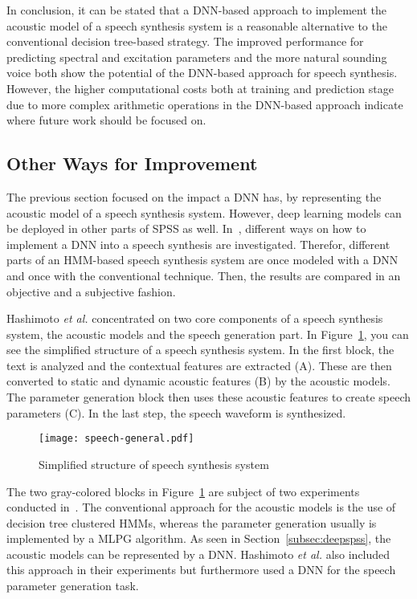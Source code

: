 In conclusion, it can be stated that a \ac{DNN}-based approach to implement the acoustic model
of a speech synthesis system is a reasonable alternative to the conventional decision tree-based strategy. The improved performance for predicting spectral and excitation parameters and the more natural sounding voice both show the potential of the \ac{DNN}-based approach for speech synthesis. However, the higher computational costs both at training and prediction stage due to more complex arithmetic operations in the \ac{DNN}-based approach indicate where future work should be focused on.

\subsection{Other Ways for Improvement}
\label{subsec:deepeffect}

The previous section focused on the impact a \ac{DNN} has, by representing the acoustic model of a speech synthesis system. However, deep learning models can be deployed in other parts of \ac{SPSS} as well. In~\cite{hashimoto:effect}, different ways on how to implement a \ac{DNN} into a speech synthesis are investigated. Therefor, different parts of an \ac{HMM}-based speech synthesis system are once modeled with a \ac{DNN} and once with the conventional technique. Then, the results are compared in an objective and a subjective fashion.

Hashimoto \textit{et al.} concentrated on two core components of a speech synthesis system, the acoustic models and the speech generation part. In Figure~\ref{fig:generalspeech}, you can see the simplified structure of a speech synthesis system. In the first block, the text is analyzed and the contextual features are extracted (A). These are then converted to static and dynamic acoustic features (B) by the acoustic models. The parameter generation block then uses these acoustic features to create speech parameters (C). In the last step, the speech waveform is synthesized.

\begin{figure}[h]
	\texttt{[image: speech-general.pdf]}
	\caption{Simplified structure of speech synthesis system~\cite{hashimoto:effect}}
	\label{fig:generalspeech}
\end{figure}

The two gray-colored blocks in Figure~\ref{fig:generalspeech} are subject of two experiments conducted in~\cite{hashimoto:effect}. The conventional approach for the acoustic models is the use of decision tree clustered \acp{HMM}, whereas the parameter generation usually is implemented by a \ac{MLPG} algorithm. As seen in Section~\ref{subsec:deepspss}, the acoustic models can be represented by a \ac{DNN}. Hashimoto \textit{et al.} also included this approach in their experiments but furthermore used a \ac{DNN} for the speech parameter generation task.

